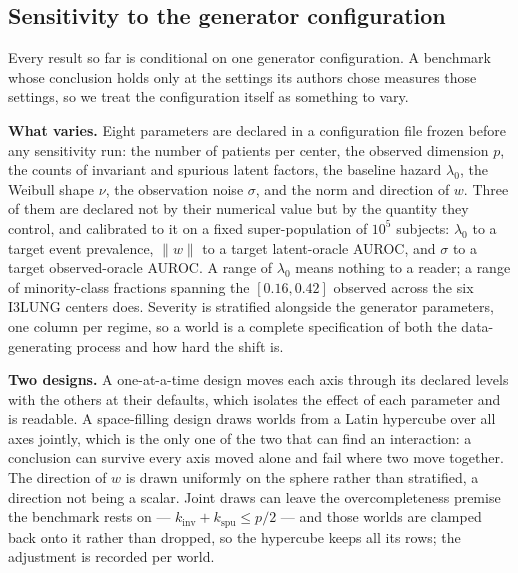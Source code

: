 %

\subsection{Sensitivity to the generator configuration}
\label{sec:sensitivity}

Every result so far is conditional on one generator configuration. A benchmark
whose conclusion holds only at the settings its authors chose measures those
settings, so we treat the configuration itself as something to vary.

\textbf{What varies.}
Eight parameters are declared in a configuration file frozen before any
sensitivity run: the number of patients per center, the observed dimension
$p$, the counts of invariant and spurious latent factors, the baseline hazard
$\lambda_0$, the Weibull shape $\nu$, the observation noise $\sigma$, and the
norm and direction of $w$. Three of them are declared not by their numerical
value but by the quantity they control, and calibrated to it on a fixed
super-population of $10^5$ subjects: $\lambda_0$ to a target event prevalence,
$\|w\|$ to a target latent-oracle AUROC, and $\sigma$ to a target
observed-oracle AUROC. A range of $\lambda_0$ means nothing to a reader; a
range of minority-class fractions spanning the $[0.16, 0.42]$ observed across
the six I3LUNG centers does. Severity is stratified alongside the generator
parameters, one column per regime, so a world is a complete specification of
both the data-generating process and how hard the shift is.

\textbf{Two designs.}
A one-at-a-time design moves each axis through its declared levels with the
others at their defaults, which isolates the effect of each parameter and is
readable. A space-filling design draws worlds from a Latin hypercube over all
axes jointly, which is the only one of the two that can find an interaction:
a conclusion can survive every axis moved alone and fail where two move
together. The direction of $w$ is drawn uniformly on the sphere rather than
stratified, a direction not being a scalar. Joint draws can leave the
overcompleteness premise the benchmark rests on --- $k_{\text{inv}}+k_{\text{spu}}
\le p/2$ --- and those worlds are clamped back onto it rather than dropped, so
the hypercube keeps all its rows; the adjustment is recorded per world.

